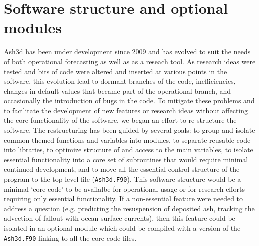 \chapter{Software structure and optional modules}\label{ChapSoftwareStructure}
Ash3d has been under development since 2009 and has evolved to suit
the needs of both operational forecasting as well as as a reseach tool.
As research ideas were tested and bits of code were altered and inserted
at various points in the software, this evolution lead to dormant
branches of the code, inefficiencies, changes in default values that became
part of the operational branch, and occasionally the introduction of 
bugs in the code.  To mitigate these problems and to facilitate the
development of new features or research ideas without affecting the core
functionality of the software, we began an effort to re-structure the
software.  The restructuring has been guided by several goals:
to group and isolate common-themed functions and variables into modules,
to separate reusable code into libraries,
to optimize structure of and access to the main variables,
to isolate essential functionality into a core set of subroutines that
would require minimal continued development, and
to move all the essential control structure of the program to 
the top-level file (\texttt{Ash3d.F90}).
This software structure would be a minimal `core code' to be availalbe for
operational usage or for research efforts requiring only essential functionality.
If a non-essential feature were needed to address a question (e.g. predicting
the resuspension of deposited ash, tracking the advection of fallout with
ocean surface currents), then this feature could be isolated in an optional
module which could be compiled with a version of the \texttt{Ash3d.F90} linking
to all the core-code files.

